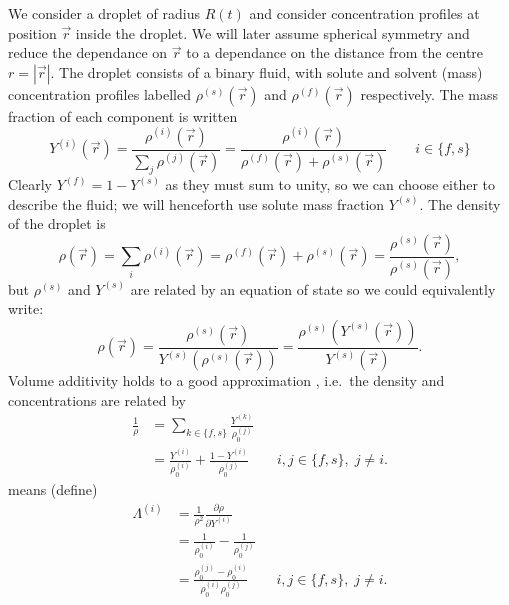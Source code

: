 \documentclass[11pt,twoside]{report}
\begin{document}
We consider a droplet of radius $R(t)$ and consider concentration profiles at position $\vec{r}$ inside the droplet.
We will later assume spherical symmetry and reduce the dependance on $\vec{r}$ to a dependance on the distance from the centre $r = |\vec{r}|$.
The droplet consists of a binary fluid, with solute and solvent (mass) concentration profiles labelled $\rho^{(s)}(\vec{r})$ and $\rho^{(f)}(\vec{r})$ respectively.
The mass fraction of each component is written
\begin{equation}\label{eq:mass-fraction}
  Y^{(i)}(\vec{r}) = \frac{\rho^{(i)}(\vec{r})}{\sum_j \rho^{(j)}(\vec{r})} = \frac{\rho^{(i)}(\vec{r})}{\rho^{(f)}(\vec{r}) + \rho^{(s)}(\vec{r})} \qquad i \in \{f, s\}
\end{equation}
Clearly $Y^{(f)} = 1 - Y^{(s)}$ as they must sum to unity, so we can choose either to describe the fluid;
we will henceforth use solute mass fraction $Y^{(s)}$.
The density of the droplet is
\begin{equation}
  \rho(\vec{r}) = \sum_i \rho^{(i)}(\vec{r}) = \rho^{(f)}(\vec{r}) + \rho^{(s)}(\vec{r}) = \frac{\rho^{(s)}(\vec{r})}{\rho^{(s)}(\vec{r})},
\end{equation}
but $\rho^{(s)}$ and $Y^{(s)}$ are related by an equation of state so we could equivalently write:
\begin{equation}
  \rho(\vec{r}) =
  \frac{\rho^{(s)}(\vec{r})}{Y^{(s)}(\rho^{(s)}(\vec{r}))} =
  \frac{\rho^{(s)}(Y^{(s)}(\vec{r}))}{Y^{(s)}(\vec{r})}.
\end{equation}
Volume additivity holds to a good approximation \cite{Handscomb???}, i.e.\ the density and concentrations are related by
\begin{equation}\label{eq:volume-additivity}
  \begin{aligned}
    \frac{1}{\rho} &=
    \sum_{k \in \{f,s\}} \frac{Y^{(k)}}{\rho^{(j)}_0} \\
    &=
    \frac{Y^{(i)}}{\rho^{(i)}_0} +
    \frac{1 - Y^{(i)}}{\rho^{(j)}_0}
    \qquad i,j \in \{f,s\}, \; j \ne i.
  \end{aligned}
\end{equation}
means
(define)
\begin{equation}\label{eq:density-lambda}
  \begin{aligned}
    \Lambda^{(i)} &=
    \frac{1}{\rho^2} \frac{\partial \rho}{\partial Y^{(i)}} \\
    &=
    \frac{1}{\rho^{(i)}_0} -
    \frac{1}{\rho^{(j)}_0}
    \\
    &=
    \frac{\rho^{(j)}_0 - \rho^{(i)}_0}{\rho^{(i)}_0\rho^{(j)}_0}
    \qquad i,j \in \{f,s\}, \; j \ne i.
  \end{aligned}
\end{equation}
\end{document}
